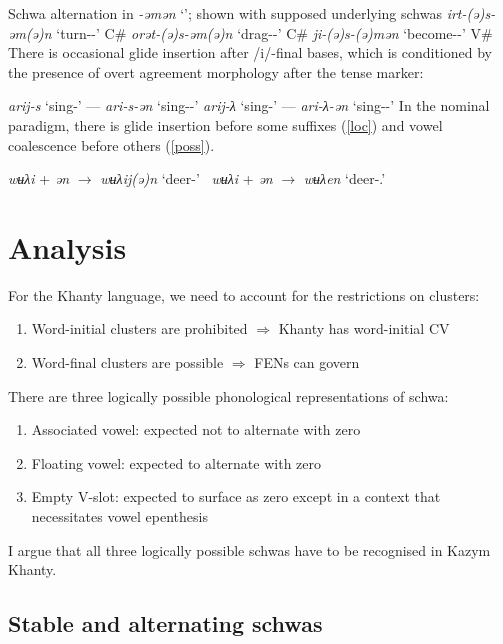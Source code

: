 \documentclass[a4paper, 12pt]{article}
\begin{document}
	\pex Schwa alternation in \emph{-əmən} `{\Fdu}'; shown with supposed underlying schwas 
		\a \emph{irt-(ə)s-əm(ə)n} `turn-{\Pst}-{\Fdu}' \hfill C\#
		\a \emph{orət-(ə)s-əm(ə)n} `drag-{\Pst}-{\Fdu}' \hfill C\#
		\a \emph{ji-(ə)s-(ə)mən} `become-{\Pst}-{\Fdu}' \hfill V\#
	\xe
	There is occasional glide insertion after /i/-final bases, which is conditioned by the presence of overt agreement morphology after the tense marker:
	
\pex
	\a \emph{arij-s} `sing-{\Pst}' --- \emph{ari-s-ən} `sing-{\Pst}-{\Ssg}'
	\a \emph{arij-λ} `sing-{\Npst}' --- \emph{ari-λ-ən} `sing-{\Npst}-{\Ssg}'
\xe
	In the nominal paradigm, there is glide insertion before some suffixes (\ref{loc}) and vowel coalescence before others (\ref{poss}).
	
	\ex\label{loc}\emph{wʉλi} + \emph{ən} $\rightarrow$ \emph{wʉλij(ə)n} `deer-{\Loc}' \xe
	\ex~\label{poss}\emph{wʉλi} + \emph{ən} $\rightarrow$ \emph{wʉλen} `deer-{\Poss}.{\Spl}' \xe
	
	\section{Analysis}
	
	For the Khanty language, we need to account for the restrictions on clusters:
	
\begin{enumerate}[$\gg$]
	\item Word-initial clusters are prohibited $\Rightarrow$ Khanty has word-initial CV
	\item Word-final clusters are possible $\Rightarrow$ FENs can govern
\end{enumerate}
	There are three logically possible phonological representations of schwa:
	
\begin{enumerate}[$\gg$]
	\item Associated vowel: expected not to alternate with zero
	\item Floating vowel: expected to alternate with zero 
	\item Empty V-slot: expected to surface as zero except in a context that necessitates vowel epenthesis
\end{enumerate}
	I argue that all three logically possible schwas have to be recognised in Kazym Khanty.
	
		\subsection{Stable and alternating schwas}
		
\end{document}
